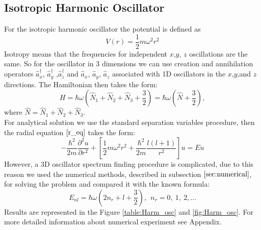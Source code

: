 \documentclass[a4paper, 12pt]{article}
\begin{document}
\subsection{Isotropic Harmonic Oscillator}
For the isotropic harmonic oscillator the potential is defined as
$$V(r) = \frac{1}{2} m \omega^2 r^2 $$
Isotropy means that the frequencies for independent $x$,$y$, $z$ oscillations are the same. So for the oscillator in 3 dimensions we can use creation and annihilation operators $\hat{a}_x^\dag$, $\hat{a}_y^\dag$ ,$\hat{a}_z^\dag$ and $\hat{a}_x$,  $\hat{a}_y$, $\hat{a}_z$ associated with 1D oscillators in the $x$,$y$,and $z$ directions. The Hamiltonian then takes the form:
$$H = \hbar \omega (\hat{N}_1 + \hat{N}_2 + \hat{N}_3 + \frac{3}{2}) = \hbar \omega (\hat{N} + \frac{3}{2}),$$
where $\hat{N} = \hat{N}_1 + \hat{N}_2 + \hat{N}_3 .$\\
For analytical solution we use the standard separation variables procedure, then the radial equation  $\eqref{r_eq}$ takes the form:
$$-\frac{\hbar^2}{2m}\frac{\partial^2 u}{\partial r^2}+[\frac{1}{2} m \omega^2 r^2+\frac{\hbar^2}{2m}\frac{l(l+1)}{r^2}]u = Eu$$
However, a  3D oscillator spectrum finding procedure is complicated, due to this reason we used the numerical methods, described in subsection  $\ref{sec:numerical}$, for solving the problem and compared it with the known formula:
\begin{equation}
	E_{nl} = \hbar \omega (2 n_r +l+\frac{3}{2}),~~ n_r = 0,~1,~2,...
\end{equation}
Results are represented in the Figure \ref{table:Harm_osc} and  \ref{fig:Harm_osc}. For more detailed information about numerical experiment see Appendix.
\end{document}

